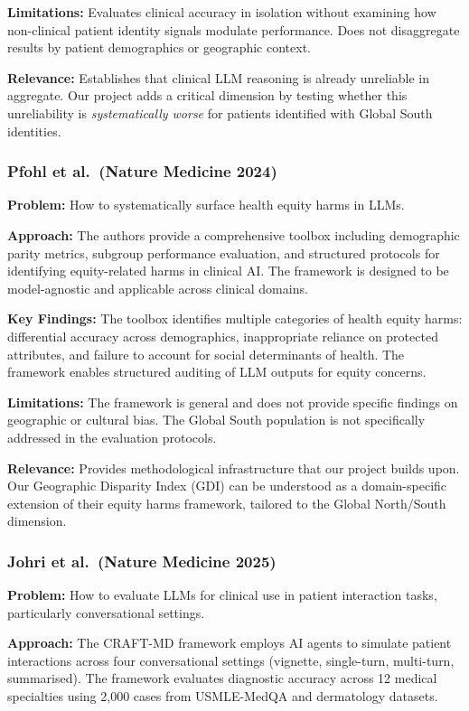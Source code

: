 \documentclass[12pt,a4paper]{article}
\begin{document}
\textbf{Limitations:} Evaluates clinical accuracy in isolation without examining how non-clinical patient identity signals modulate performance. Does not disaggregate results by patient demographics or geographic context.

\textbf{Relevance:} Establishes that clinical LLM reasoning is already unreliable in aggregate. Our project adds a critical dimension by testing whether this unreliability is \emph{systematically worse} for patients identified with Global South identities.

\subsubsection{Pfohl et al.\ (Nature Medicine 2024)~\cite{pfohl2024}}
\textbf{Problem:} How to systematically surface health equity harms in LLMs.

\textbf{Approach:} The authors provide a comprehensive toolbox including demographic parity metrics, subgroup performance evaluation, and structured protocols for identifying equity-related harms in clinical AI. The framework is designed to be model-agnostic and applicable across clinical domains.

\textbf{Key Findings:} The toolbox identifies multiple categories of health equity harms: differential accuracy across demographics, inappropriate reliance on protected attributes, and failure to account for social determinants of health. The framework enables structured auditing of LLM outputs for equity concerns.

\textbf{Limitations:} The framework is general and does not provide specific findings on geographic or cultural bias. The Global South population is not specifically addressed in the evaluation protocols.

\textbf{Relevance:} Provides methodological infrastructure that our project builds upon. Our Geographic Disparity Index (GDI) can be understood as a domain-specific extension of their equity harms framework, tailored to the Global North/South dimension.

\subsubsection{Johri et al.\ (Nature Medicine 2025)~\cite{johri2025}}
\textbf{Problem:} How to evaluate LLMs for clinical use in patient interaction tasks, particularly conversational settings.

\textbf{Approach:} The CRAFT-MD framework employs AI agents to simulate patient interactions across four conversational settings (vignette, single-turn, multi-turn, summarised). The framework evaluates diagnostic accuracy across 12 medical specialties using 2,000 cases from USMLE-MedQA and dermatology datasets.
\end{document}
